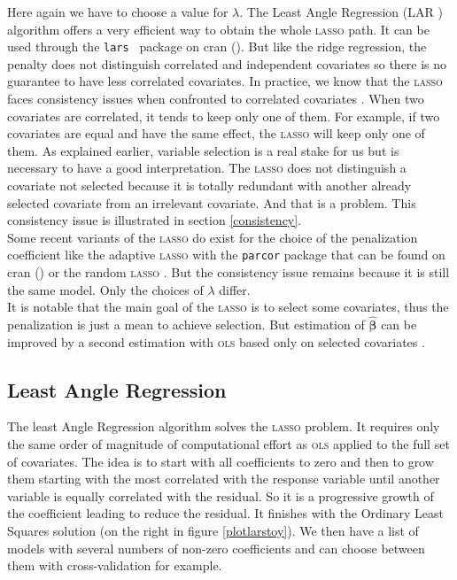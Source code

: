\documentclass[12pt,a4paper]{report}
\begin{document}
		Here again we have to choose a value for $\lambda$.
	 The Least Angle Regression (\textsc{LAR} \cite{efron2004least}) algorithm offers a very efficient way to obtain the whole \textsc{lasso} path.  It can be used through the {\tt lars } package on {\sc cran} (\cite{packagelars}). But like the ridge regression, the penalty does not distinguish correlated and independent covariates so there is no guarantee to have less correlated covariates. In practice, we know that the \textsc{lasso} faces consistency issues when confronted to correlated covariates \cite{Zhao2006MSC}. When two covariates are correlated, it tends to keep only one of them. For example, if two covariates are equal and have the same effect, the \textsc{lasso} will keep only one of them. As explained earlier, variable selection is a real stake for us but is necessary to have a good interpretation. The \textsc{lasso} does not distinguish a covariate not selected because it is totally redundant with another already selected covariate from an irrelevant covariate. And that is a problem. This consistency issue is illustrated in section \ref{consistency}.\\



			 Some recent variants of the \textsc{lasso} do exist for the choice of the penalization coefficient like the adaptive \textsc{lasso} \cite{zou2006adaptive} with the {\tt parcor} package that can be found on {\sc cran} (\cite{packageparcor}) or the random \textsc{lasso} \cite{wang2011random}.  But the consistency issue remains because it is still the same model. Only the choices of $\lambda$ differ.\\
			 
			 It is notable that the main goal of the \textsc{lasso} is to select some covariates, thus the penalization is just a mean to achieve selection. But estimation of $\hat{\boldsymbol{\beta}}$ can be improved by a second estimation with \textsc{ols} based only on selected covariates \cite{SAM10088}.
		\subsection{Least Angle Regression}
		The least Angle Regression algorithm solves the \textsc{lasso} problem.
		It requires only the same order of magnitude of computational effort as \textsc{ols} applied to the full set of covariates.
		The idea is to start with all coefficients to zero and then to grow them starting with the most correlated with the response variable until another variable is equally correlated with the residual. So it is a progressive growth of the coefficient leading to reduce the residual. It finishes with the Ordinary Least Squares solution (on the right in figure \ref{plotlarstoy}). We then have a list of models with several numbers of non-zero coefficients and can choose between them with cross-validation for example.\\
		
\end{document}
